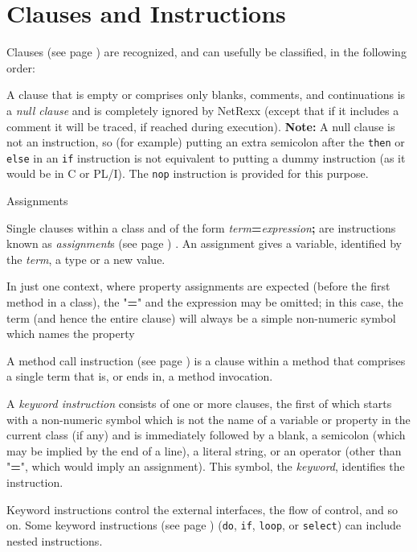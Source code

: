 \chapter{Clauses and Instructions}\label{"id"}
  Clauses (see page \pageref{refclau})  are recognized, and can usefully be
classified, in the following order:
\begin{description}
\item[Null clauses]\label{refnullcl}

A clause that is empty or comprises only blanks, comments, and
continuations is a \emph{null clause} and is completely ignored by
NetRexx (except that if it includes a comment it will be traced, if
reached during execution).
\textbf{Note: }A null clause is not an instruction, so (for example) putting an
extra semicolon after the \texttt{then} or \texttt{else} in an
\texttt{if} instruction is not equivalent to putting a dummy instruction
(as it would be in C or PL/I).
The \texttt{nop} instruction is provided for this purpose.
\item{Assignments}

Single clauses within a class and of the form
\emph{term}\textbf{=}\emph{expression}\textbf{;} are
instructions known as  \emph{assignment}s (see page \pageref{refassign}) .
An assignment gives a variable, identified by the
\emph{term}, a type or a new value.
 
In just one context, where property assignments are expected (before the
first method in a class), the "\textbf{=}" and the expression may
be omitted; in this case, the term (and hence the entire clause) will
always be a simple non-numeric symbol which names the property
\item[Method call instructions]\label{refxmeth}

A  method call instruction (see page \pageref{refmcalli})  is a clause within a
method that comprises a single term that is, or ends in, a method
invocation.
\item[Keyword instructions]\label{refkwcl}

A \emph{keyword instruction} consists of one or more clauses,
the first of which starts with a non-numeric symbol which is not the
name of a variable or property in the current class (if any) and is
immediately followed by a blank, a semicolon (which may be implied by
the end of a line), a literal string, or an operator (other than
"\textbf{=}", which would imply an assignment).
This symbol, the \emph{keyword}, identifies the instruction.
 
Keyword instructions control the external interfaces, the flow of
control, and so on.
Some  keyword instructions (see page \pageref{refkinst})  (\texttt{do}, \texttt{if},
\texttt{loop}, or \texttt{select}) can include nested instructions.
\end{description}

